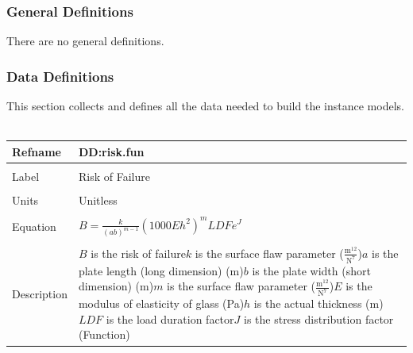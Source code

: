 \documentclass[12pt]{article}
\begin{document}
\subsubsection{General Definitions}
\label{Sec:GDs}
There are no general definitions.
\subsubsection{Data Definitions}
\label{Sec:DDs}
This section collects and defines all the data needed to build the instance models.
~\newline
\noindent \begin{minipage}{\textwidth}
\begin{tabular}{p{} p{}}
\toprule \textbf{Refname} & \textbf{DD:risk.fun}
\label{DD:risk.fun}
\\ \midrule \\
Label & Risk of Failure
\\ \midrule \\
Units & Unitless
\\ \midrule \\
Equation & $B=\frac{k}{\left(a b\right)^{m-1}} \left(1000 E h^{2}\right)^{m} LDF e^{J}$
\\ \midrule \\
Description & $B$ is the risk of failure\newline$k$ is the surface flaw parameter ($\frac{\text{m}^{12}}{\text{N}^{7}}$)\newline$a$ is the plate length (long dimension) (m)\newline$b$ is the plate width (short dimension) (m)\newline$m$ is the surface flaw parameter ($\frac{\text{m}^{12}}{\text{N}^{7}}$)\newline$E$ is the modulus of elasticity of glass (Pa)\newline$h$ is the actual thickness (m)\newline$LDF$ is the load duration factor\newline$J$ is the stress distribution factor (Function)
\\ \bottomrule \end{tabular}
\end{minipage}\\
~\newline
\end{document}
